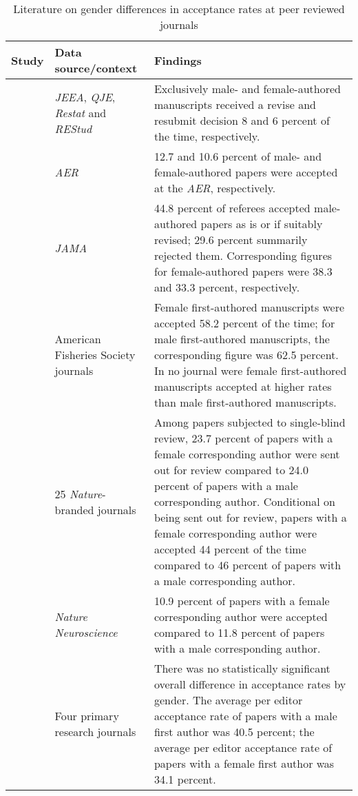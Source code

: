 \begin{table}[H]
	\footnotesize
	\centering
	\begin{threeparttable}
		\caption{Literature on gender differences in acceptance rates at peer reviewed journals}
		\label{AcceptanceRates}
		\begin{tabular}{L{3cm}L{3cm}L{8cm}}
			\toprule
			Study&Data source/context&Findings\\
			\midrule
			\citet{Card2020}&\textit{JEEA}, \textit{QJE}, \textit{Restat} and \textit{REStud}&Exclusively male- and female-authored manuscripts received a revise and resubmit decision 8 and 6 percent of the time, respectively.\\
			\citet{Blank1991}&\textit{AER}&12.7 and 10.6 percent of male- and female-authored papers were accepted at the \textit{AER}, respectively.\\
			\citet{Gilbert1994}&\textit{JAMA}&44.8 percent of referees accepted male-authored papers as is or if suitably revised; 29.6 percent summarily rejected them. Corresponding figures for female-authored papers were 38.3 and 33.3 percent, respectively.\\
			\citet{Handley2015}&American Fisheries Society journals&Female first-authored manuscripts were accepted 58.2 percent of the time; for male first-authored manuscripts, the corresponding figure was 62.5 percent. In no journal were female first-authored manuscripts accepted at higher rates than male first-authored manuscripts.\\
			\citet{McGillivray2018}&25 \textit{Nature}-branded journals&Among papers subjected to single-blind review, 23.7 percent of papers with a female corresponding author were sent out for review compared to 24.0 percent of papers with a male corresponding author. Conditional on being sent out for review, papers with a female corresponding author were accepted 44 percent of the time compared to 46 percent of papers with a male corresponding author.\\
			\citet{Nature2006}&\textit{Nature Neuroscience}&10.9 percent of papers with a female corresponding author were accepted compared to 11.8 percent of papers with a male corresponding author.\\
			\citet{Tregenza2002}&Four primary research journals&There was no statistically significant overall difference in acceptance rates by gender. The average per editor acceptance rate of papers with a male first author was 40.5 percent; the average per editor acceptance rate of papers with a female first author was 34.1 percent.\\

\end{tabular}
\end{threeparttable}
\end{table}
